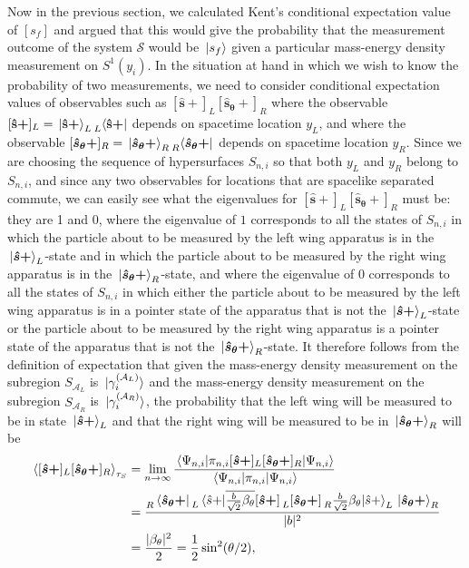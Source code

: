 Now in the previous section, we calculated Kent's conditional expectation value of $[s_f]$ and argued that this would give the probability that the measurement outcome of the system $\mathcal{S}$ would be $\ket*{s_f}$ given a particular mass-energy density measurement on $S^1(y_i)$. In the situation at hand in which we wish to know the probability of two measurements, we need to consider conditional expectation values of observables such as  $[\bm{\hat{s}+}]_L[\bm{\hat{s}_\theta+}]_R$ where the observable $[{\vb{\hat{{s}}}\bm{+}}]_L=\ket*{{\vb{\hat{{s}}}\bm{+}}}_L\prescript{}{L}{\bra{{\vb{\hat{{s}}}\bm{+}}}}$ depends on spacetime location $y_L$, and where the observable $[\bm{\hat{s}_\theta+}]_R=\ket*{\bm{\hat{s}_\theta+}}_R\prescript{}{R}{\bra{\bm{\hat{s}_\theta+}}}$ 
%
depends on spacetime location $y_R.$ Since we are choosing the sequence of hypersurfaces $S_{n,i}$ so that both $y_L$ and $y_R$ belong to $S_{n,i}$, and since any two observables for locations that are spacelike separated commute, we can easily see what the eigenvalues for  $[\bm{\hat{s}+}]_L[\bm{\hat{s}_\theta+}]_R$ must be: they are 1 and 0, where the eigenvalue of $1$ corresponds to all the states of $S_{n,i}$ in which the particle about to be measured by the left wing apparatus is in the $\ket*{\bm{\hat{s}+}}_L$-state and in which the particle about to be measured by the right wing apparatus is in the $\ket*{\bm{\hat{s}_\theta+}}_R$-state, and where the eigenvalue of $0$ corresponds to all the states of $S_{n,i}$ in which either the particle about to be measured by the left wing apparatus is in a pointer state of the apparatus that is not the $\ket*{\bm{\hat{s}+}}_L$-state or the particle about to be measured by the right wing apparatus is a pointer state of the apparatus that is not the $\ket*{\bm{\hat{s}_\theta+}}_R$-state. It therefore follows from the definition of expectation that given the mass-energy density measurement on the subregion $S_{\mathcal{A}_L}$ is $\ket*{\gamma_i^{(\mathcal{A}_L)}}$ and the mass-energy density measurement on the subregion $S_{\mathcal{A}_R}$ is $\ket*{\gamma_i^{(\mathcal{A}_R)}}$, the probability that the left wing will be measured to be in state  $\ket*{\bm{\hat{s}+}}_L$ and that the right wing will be measured to be in $\ket*{\bm{\hat{s}_\theta+}}_R$ will be
\begin{equation}\label{slsrev}
	\begin{split}
	\ev*{[\bm{\hat{s}+}]_L[\bm{\hat{s}_\theta+}]_R}_{\tau_S}
	&=\lim_{n\rightarrow\infty}\frac{\ev*{\pi_{n,i}[\bm{\hat{s}+}]_L[\bm{\hat{s}_\theta+}]_R}{\Psi_{n,i}}}{\ev*{\pi_{n,i}}{\Psi_{n,i}}}\\
	&=\frac{\prescript{}{R}{\bra*{\bm{\hat{s}_\theta+}}}\prescript{}{L}{}\ev*{\overline{\frac{b}{\sqrt{2}}\beta_{\theta}}[\bm{\hat{s}+}]\prescript{}{L}{}[\bm{\hat{s}_\theta+}]\prescript{}{R}{}\frac{b}{\sqrt{2}}\beta_{\theta}}{\hat{s}+}_L\ket*{\bm{\hat{s}_\theta+}}_R}{|b|^2}\\
	&=\frac{|\beta_\theta|^2}{2}=\frac{1}{2}\sin^2(\theta/2),
	\end{split}	
\end{equation}
